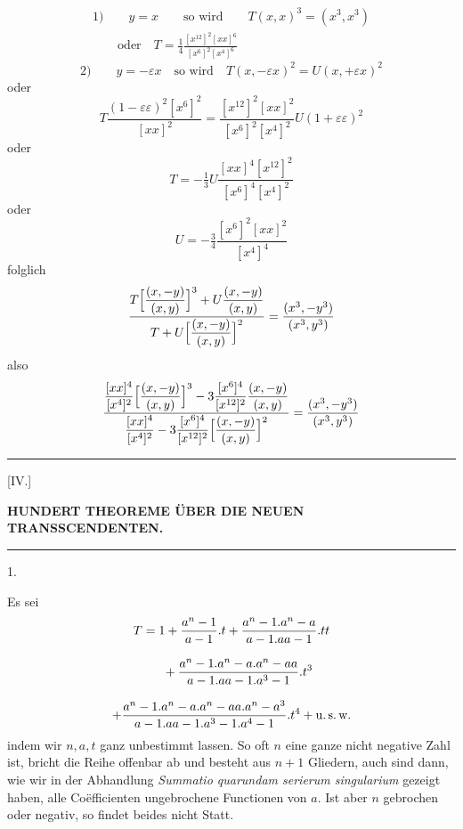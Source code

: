 \[
\begin{gathered}1)\qquad y=x\qquad\text{so wird}\qquad
T(x,x)^3=(x^3,x^3)\\[8pt]\quad{}\quad\text{oder}\quad
T=\tfrac14\frac{[x^{12}]^2[xx]^6}{[x^6]^2[x^4]^6}\end{gathered}
\]
\[
2)\qquad y=-\varepsilon x\quad\text{so wird}\quad
T(x,-\varepsilon x)^2=U(x,+\varepsilon x)^2
\]
oder
\[
T\frac{(1-\varepsilon\varepsilon)^2[x^6]^2}{[xx]^2}
=\frac{[x^{12}]^2[xx]^2}{[x^6]^2[x^4]^2}U(1+\varepsilon\varepsilon)^2
\]
oder
\[
T=-\tfrac13 U\frac{[xx]^4[x^{12}]^2}{[x^6]^4[x^4]^2}
\]
oder
\[
U=-\tfrac34\frac{[x^6]^2[xx]^2}{[x^4]^4}
\]
folglich
\[
\begin{gathered}\frac{T\Bigl[\dfrac{(x,-y)}{(x,y)}\Bigr]^3
+U\dfrac{(x,-y)}{(x,y)}}
{T+U\Bigl[\dfrac{(x,-y)}{(x,y)}\Bigr]^2}
=\frac{(x^3,-y^3)}{(x^3,y^3)}\end{gathered}
\]
also
\[
\begin{gathered}\frac{\dfrac{[xx]^4}{[x^4]^2}
\Bigl[\dfrac{(x,-y)}{(x,y)}\Bigr]^3
-3\dfrac{[x^6]^4}{[x^{12}]^2}\dfrac{(x,-y)}{(x,y)}}
{\dfrac{[xx]^4}{[x^4]^2}
-3\dfrac{[x^6]^4}{[x^{12}]^2}
\Bigl[\dfrac{(x,-y)}{(x,y)}\Bigr]^2}
=\frac{(x^3,-y^3)}{(x^3,y^3)}\end{gathered}
\]
\begin{center}\rule{.23\textwidth}{.3pt}\end{center}

\clearpage{}

\begin{center}
[IV.]\par
\bigskip
\textbf{HUNDERT THEOREME ÜBER DIE NEUEN TRANSSCENDENTEN.}\par
\medskip
\rule{.09\textwidth}{.3pt}\par
\bigskip
{}1.
\end{center}
Es sei
\[
\begin{gathered}
T={}1+\frac{a^n-1}{a-1}.t
+\frac{a^n-1.a^n-a}{a-1.aa-1}.tt
\\[8pt]\quad{}+\frac{a^n-1.a^n-a.a^n-aa}{a-1.aa-1.a^3-1}.t^3\\[8pt]
+\frac{a^n-1.a^n-a.a^n-aa.a^n-a^3}
{a-1.aa-1.a^3-1.a^4-1}.t^4+\text{u.\,s.\,w.}
\end{gathered}
\]
indem wir $n,a,t$ ganz unbestimmt lassen. So oft $n$ eine ganze nicht negative
Zahl ist, bricht die Reihe offenbar ab und besteht aus $n+1$ Gliedern, auch sind
dann, wie wir in der Abhandlung \textit{Summatio quarundam serierum singularium} gezeigt haben, alle Coëfficienten ungebrochene Functionen von $a$. Ist aber $n$ gebrochen oder negativ, so findet beides nicht Statt.

